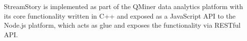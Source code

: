 StreamStory is implemented as part of the QMiner \cite{qminer} data analytics platform with its core
functionality written in C++ and exposed as a JavaScript API to the Node.js platform, which
acts as glue and exposes the functionality via RESTful API.